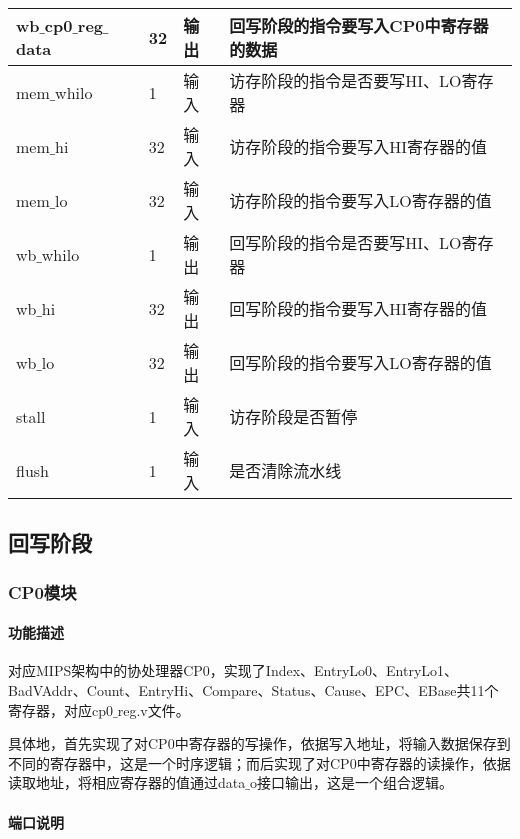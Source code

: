 \begin{table}[H]
\begin{tabular}{|l|l|l|l|}
		\hline
		wb$\_$cp0$\_$reg$\_$data & 32 & 输出 & 回写阶段的指令要写入CP0中寄存器的数据 \\
		\hline
		mem$\_$whilo & 1 & 输入 & 访存阶段的指令是否要写HI、LO寄存器 \\
		\hline
		mem$\_$hi & 32 & 输入 & 访存阶段的指令要写入HI寄存器的值 \\
		\hline
		mem$\_$lo & 32 & 输入 & 访存阶段的指令要写入LO寄存器的值 \\
		\hline
		wb$\_$whilo & 1 & 输出 & 回写阶段的指令是否要写HI、LO寄存器 \\
		\hline
		wb$\_$hi & 32 & 输出 & 回写阶段的指令要写入HI寄存器的值 \\
		\hline
		wb$\_$lo & 32 & 输出 & 回写阶段的指令要写入LO寄存器的值 \\
		\hline
		stall & 1 & 输入 & 访存阶段是否暂停 \\
		\hline
		flush & 1 & 输入 & 是否清除流水线 \\
		\hline
	\end{tabular}
\end{table}
\subsection{回写阶段}
\subsubsection{CP0模块}
\paragraph{功能描述}
\quad

\quad

对应MIPS架构中的协处理器CP0，实现了Index、EntryLo0、EntryLo1、BadVAddr、Count、EntryHi、Compare、Status、Cause、EPC、EBase共11个寄存器，对应cp0$\_$reg.v文件。

具体地，首先实现了对CP0中寄存器的写操作，依据写入地址，将输入数据保存到不同的寄存器中，这是一个时序逻辑；而后实现了对CP0中寄存器的读操作，依据读取地址，将相应寄存器的值通过data$\_$o接口输出，这是一个组合逻辑。
\paragraph{端口说明}
\quad

